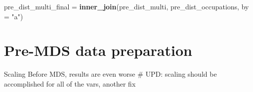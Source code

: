 \documentclass[]{article}
\newenvironment{Shaded}{\begin{snugshade}}{\end{snugshade}}
\newcommand{\KeywordTok}[1]{\textcolor[rgb]{0.13,0.29,0.53}{\textbf{{#1}}}}
\newcommand{\DataTypeTok}[1]{\textcolor[rgb]{0.13,0.29,0.53}{{#1}}}
\newcommand{\DecValTok}[1]{\textcolor[rgb]{0.00,0.00,0.81}{{#1}}}
\newcommand{\StringTok}[1]{\textcolor[rgb]{0.31,0.60,0.02}{{#1}}}
\newcommand{\CommentTok}[1]{\textcolor[rgb]{0.56,0.35,0.01}{\textit{{#1}}}}
\newcommand{\NormalTok}[1]{{#1}}
\begin{document}
\begin{Shaded}
\end{Shaded}

\begin{Shaded}
\begin{Highlighting}[]
\NormalTok{pre_dist_multi_final =}\StringTok{ }\KeywordTok{inner_join}\NormalTok{(pre_dist_multi, pre_dist_occupations, }\DataTypeTok{by =} \StringTok{"a"}\NormalTok{)}
\end{Highlighting}
\end{Shaded}

\section{Pre-MDS data preparation}\label{pre-mds-data-preparation}

Scaling Before MDS, results are even worse \# UPD: scaling should be
accomplished for all of the vars, another fix

\begin{Shaded}
\end{Shaded}
\end{document}
